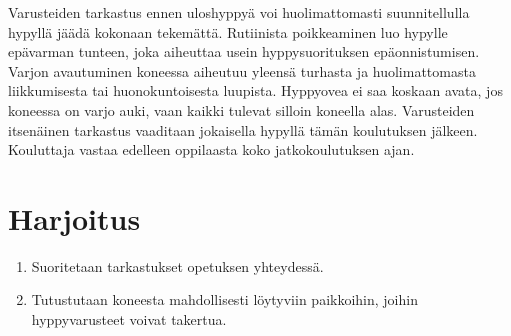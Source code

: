 Varusteiden tarkastus ennen uloshyppyä voi huolimattomasti suunnitellulla hypyllä jäädä kokonaan tekemättä. Rutiinista poikkeaminen luo hypylle epävarman tunteen, joka aiheuttaa usein hyppysuorituksen epäonnistumisen. Varjon avautuminen koneessa aiheutuu yleensä turhasta ja huolimattomasta liikkumisesta tai huonokuntoisesta luupista. Hyppyovea ei saa koskaan avata, jos koneessa on varjo auki, vaan kaikki tulevat silloin koneella alas. Varusteiden itsenäinen tarkastus vaaditaan jokaisella hypyllä tämän koulutuksen jälkeen. Kouluttaja vastaa edelleen oppilaasta koko jatkokoulutuksen ajan. 

\section{Harjoitus}
\label{varusteiden-tarkastus-harjoitus}

\begin{enumerate}[label=\bfseries \arabic*)]
\item  Suoritetaan tarkastukset opetuksen yhteydessä. 
\item  Tutustutaan koneesta mahdollisesti löytyviin paikkoihin, joihin hyppyvarusteet voivat takertua. 
\end{enumerate}
